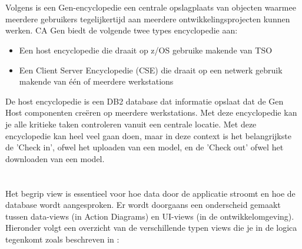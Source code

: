  \section{}%
 \label{sec:Host Encyclopedie}
 Volgens \textcite{Broadcom2026} is een Gen-encyclopedie een centrale opslagplaats van objecten waarmee meerdere gebruikers tegelijkertijd aan meerdere ontwikkelingsprojecten kunnen werken. CA Gen biedt de volgende twee types encyclopedie aan:
 \begin{itemize}
     \item Een host encyclopedie die draait op z/OS gebruike makende van TSO
     \item Een Client Server Encyclopedie (CSE) die draait op een netwerk gebruik makende van één of meerdere werkstations
 \end{itemize}
 De host encyclopedie is een DB2 database dat informatie opslaat  dat de Gen Host componenten creëren op meerdere werkstations. Met deze encyclopedie kan je alle kritieke taken controleren vanuit een centrale locatie. Met deze encyclopedie kan heel veel gaan doen, maar in deze context is het belangrijkste de 'Check in', ofwel het uploaden van een model, en de 'Check out' ofwel het downloaden van een model.
 
 \section{}%
 \label{sec:Views}
 Het begrip view is essentieel voor hoe data door de applicatie stroomt en hoe de database wordt aangesproken. Er wordt doorgaans een onderscheid gemaakt tussen data-views (in Action Diagrams) en UI-views (in de ontwikkelomgeving). Hieronder volgt een overzicht van de verschillende typen views die je in de logica tegenkomt zoals beschreven in \textcite{Broadcom2026}:
 \newline
 
